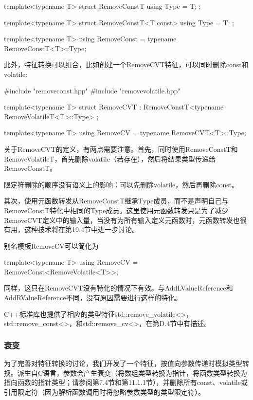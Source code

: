 \begin{cpp}
template<typename T>
struct RemoveConstT {
	using Type = T;
};

template<typename T>
struct RemoveConstT<T const> {
	using Type = T;
};

template<typename T>
using RemoveConst = typename RemoveConstT<T>::Type;
\end{cpp}

此外，特征转换可以组合，比如创建一个RemoveCVT特征，可以同时删除const和volatile:

\begin{cpp}
#include "removeconst.hpp"
#include "removevolatile.hpp"

template<typename T>
struct RemoveCVT : RemoveConstT<typename RemoveVolatileT<T>::Type> {
};

template<typename T>
using RemoveCV = typename RemoveCVT<T>::Type;
\end{cpp}

关于RemoveCVT的定义，有两点需要注意。首先，同时使用RemoveConstT和RemoveVolatileT，首先删除volatile（若存在），然后将结果类型传递给RemoveConstT。

\begin{notice}
限定符删除的顺序没有语义上的影响：可以先删除volatile，然后再删除const。
\end{notice}

其次，使用元函数转发从RemoveConstT继承Type成员，而不是声明自己与RemoveConstT特化中相同的Type成员。这里使用元函数转发只是为了减少RemoveCVT定义中的输入量，当没有为所有输入定义元函数时，元函数转发也很有用，这种技术将在第19.4节中进一步讨论。

别名模板RemoveCV可以简化为

\begin{cpp}
template<typename T>
using RemoveCV = RemoveConst<RemoveVolatile<T>>;
\end{cpp}

同样，这只在RemoveCVT没有特化的情况下有效。与AddLValueReference和AddRValueReference不同，没有原因需要进行这样的特化。

C++标准库也提供了相应的类型特征std::remove\_volatile<>， std::remove\_const<>，和std::remove\_cv<>，在第D.4节中有描述。

\subsubsection{衰变}

为了完善对特征转换的讨论，我们开发了一个特征，按值向参数传递时模拟类型转换。派生自C语言，参数会产生衰变（将数组类型转换为指针，将函数类型转换为指向函数的指针类型；请参阅第7.4节和第11.1.1节），并删除所有const、volatile或引用限定符（因为解析函数调用时将忽略参数类型的类型限定符）。

